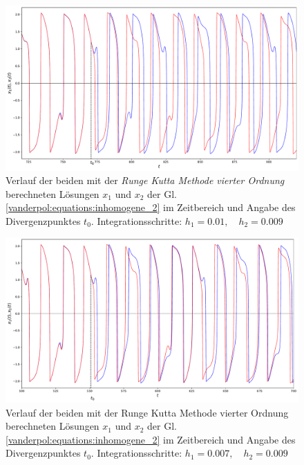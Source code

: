 \begin{figure}
\includegraphics[width=\textwidth]{papers/vanderpol/figures/RK_schritt_delta_e-3.pdf}
\caption{Verlauf der beiden mit der {\em Runge Kutta Methode vierter Ordnung} berechneten Lösungen $x_1$ und $x_2$ der Gl. \ref{vanderpol:equations:inhomogene_2} im Zeitbereich und Angabe des Divergenzpunktes $t_0$. Integrationsschritte: $h_1 = 0.01, \quad h_2 = 0.009$\label{vanderpol:figures:RK_schritt_e-3}}
\end{figure}

\begin{figure}
\includegraphics[width=\textwidth]{papers/vanderpol/figures/RK_schritt_delta_2e-3_2.pdf}
\caption{Verlauf der beiden mit der Runge Kutta Methode vierter Ordnung berechneten Lösungen $x_1$ und $x_2$ der Gl. \ref{vanderpol:equations:inhomogene_2} im Zeitbereich und Angabe des Divergenzpunktes $t_0$. Integrationsschritte: $h_1 = 0.007, \quad h_2 = 0.009$\label{vanderpol:figures:RK_schritt_2e-3}}
\end{figure}

